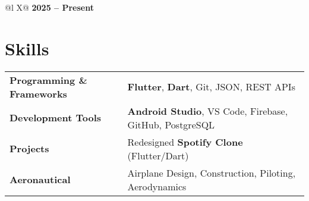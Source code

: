 \documentclass[a4paper,12pt]{article}
\begin{document}
\begin{tabularx}{\linewidth}{ @{}l X@{} }
 \hfill \textbf{2025 – Present} \\[3.75pt]
\end{tabularx}


\section{Skills}

\begin{tabularx}{\linewidth}{@{}l X@{}}
    \textbf{Programming \& Frameworks} & \textbf{Flutter}, \textbf{Dart}, Git, JSON, REST APIs \\
    \textbf{Development Tools} & \textbf{Android Studio}, VS Code, Firebase, GitHub, PostgreSQL \\
    \textbf{Projects} & Redesigned \textbf{Spotify Clone} (Flutter/Dart) \\
    \textbf{Aeronautical} & Airplane Design, Construction, Piloting, Aerodynamics \\
\end{tabularx}

\vfill
{}
\end{document}
